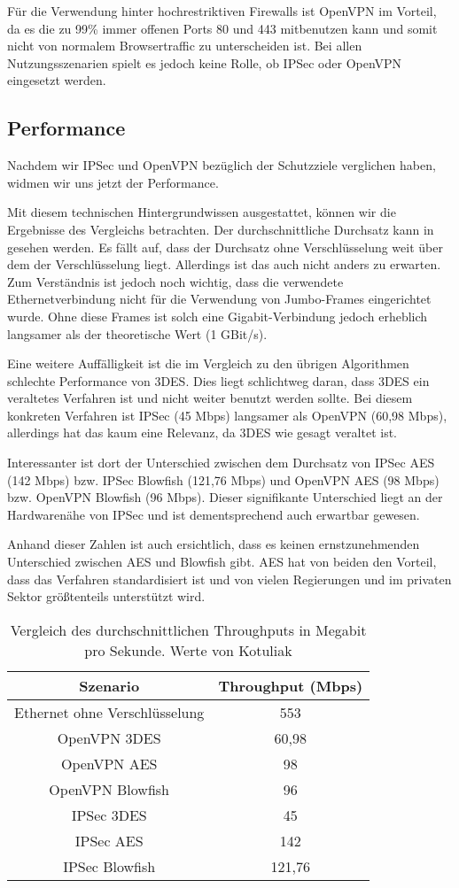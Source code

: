 \documentclass[12pt]{scrartcl}
\begin{document}
Für die Verwendung hinter hochrestriktiven Firewalls ist OpenVPN im Vorteil, da es die zu 99\% immer offenen Ports 80 und 443 mitbenutzen kann und somit nicht von normalem Browsertraffic zu unterscheiden ist. Bei allen Nutzungsszenarien spielt es jedoch keine Rolle, ob IPSec oder OpenVPN eingesetzt werden.

\subsection{Performance}
Nachdem wir IPSec und OpenVPN bezüglich der Schutzziele verglichen haben, widmen wir uns jetzt der Performance.

Mit diesem technischen Hintergrundwissen ausgestattet, können wir die Ergebnisse des Vergleichs betrachten. Der durchschnittliche Durchsatz kann in  gesehen werden. Es fällt auf, dass der Durchsatz ohne Verschlüsselung weit über dem der Verschlüsselung liegt. Allerdings ist das auch nicht anders zu erwarten. Zum Verständnis ist jedoch noch wichtig, dass die verwendete Ethernetverbindung nicht für die Verwendung von Jumbo-Frames eingerichtet wurde. Ohne diese Frames ist solch eine Gigabit-Verbindung jedoch erheblich langsamer als der theoretische Wert (1 GBit/s).\cite{Kotuliak2011}

Eine weitere Auffälligkeit ist die im Vergleich zu den übrigen Algorithmen schlechte Performance von 3DES. Dies liegt schlichtweg daran, dass 3DES ein veraltetes Verfahren ist und nicht weiter benutzt werden sollte. Bei diesem konkreten Verfahren ist IPSec (45 Mbps) langsamer als OpenVPN (60,98 Mbps), allerdings hat das kaum eine Relevanz, da 3DES wie gesagt veraltet ist.

Interessanter ist dort der Unterschied zwischen dem Durchsatz von IPSec AES (142 Mbps) bzw. IPSec Blowfish (121,76 Mbps) und OpenVPN AES (98 Mbps) bzw. OpenVPN Blowfish (96 Mbps). Dieser signifikante Unterschied liegt an der Hardwarenähe von IPSec und ist dementsprechend auch erwartbar gewesen.

Anhand dieser Zahlen ist auch ersichtlich, dass es keinen ernstzunehmenden Unterschied zwischen AES und Blowfish gibt. AES hat von beiden den Vorteil, dass das Verfahren standardisiert ist und von vielen Regierungen und im privaten Sektor größtenteils unterstützt wird.

\begin{table}
\caption{Vergleich des durchschnittlichen Throughputs in Megabit pro Sekunde. Werte von Kotuliak\cite{Kotuliak2011}}
\label{tab:tp}
\begin{tabular}{c|c}
Szenario & Throughput (Mbps) \\
\hline
Ethernet ohne Verschlüsselung & 553 \\
OpenVPN 3DES & 60,98 \\
OpenVPN AES & 98 \\
OpenVPN Blowfish & 96 \\
IPSec 3DES & 45 \\
IPSec AES & 142 \\
IPSec Blowfish & 121,76
\end{tabular}
\end{table}
\end{document}
